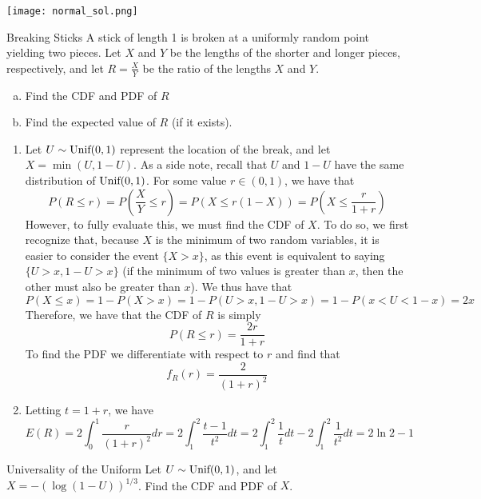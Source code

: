 \documentclass[11.5pt]{article}
\begin{document}
 \begin{solution}{3}
 \texttt{[image: normal\_sol.png]}
 \end{solution}

\begin{exercise}{Breaking Sticks}
A stick of length 1 is broken at a uniformly random point yielding two pieces. Let $X$ and $Y$ be the lengths of the shorter and longer pieces, respectively, and let $R = \frac{X}{Y}$ be the ratio of the lengths $X$ and $Y$. 
\begin{enumerate} [(a)]
\item Find the CDF and PDF of $R$
\item Find the expected value of $R$ (if it exists). 
\end{enumerate}

\begin{solution}{3} 
\begin{enumerate}
\item Let $U \sim \textrm{Unif}(0,1)$ represent the location of the break, and let $X = \min(U, 1-U)$. As a side note, recall that $U$ and $1-U$ have the same distribution of $\textrm{Unif}(0,1)$. For some value $r \in (0,1)$, we have that 
    $$P(R \leq r) = P(\frac{X}{Y} \leq r) = 
    P(X \leq r (1-X)) = P (X \leq \frac{r}{1+r})$$
However, to fully evaluate this, we must find the CDF of $X$. To do so, we first recognize that, because $X$ is the minimum of two random variables, it is easier to consider the event $\{X > x\}$, as this event is equivalent to saying $\{U > x, 1-U > x\}$ (if the minimum of two values is greater than $x$, then the other must also be greater than $x$). We thus have that
    $$P(X \leq x) = 1 - P(X > x) = 1-P(U > x, 1-U >x) = 1 -
    P(x < U < 1-x) = 2x$$
Therefore, we have that the CDF of $R$ is simply
    $$P(R \leq r) = \frac{2r}{1+r}$$
To find the PDF we differentiate with respect to $r$ and find that 
    $$f_R(r) = \frac{2}{(1+r)^2}$$
\item Letting $t = 1+r$, we have 
    $$E(R) = 2 \int_0^1 \frac{r}{(1+r)^2} dr = 2 \int_1^2 
    \frac{t-1}{t^2} dt = 2\int_1^2 \frac{1}{t} dt - 2 
    \int_1^2 \frac{1}{t^2} dt = 2 \ln 2 - 1$$
\end{enumerate}
\end{solution}
\end{exercise}

\begin{exercise}{Universality of the Uniform} 
 Let $U \sim \textrm{Unif}(0,1)$, and let $X = -(\log(1-U))^{1/3}$. Find the CDF and PDF of $X$.
\end{exercise}
\end{document}
